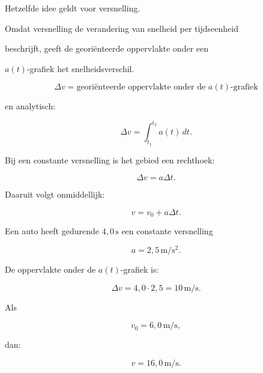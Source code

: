 \documentclass{ximera}
\begin{document}

Hetzelfde idee geldt voor versnelling.

Omdat versnelling de verandering van snelheid per tijdseenheid

beschrijft, geeft de georiënteerde oppervlakte onder een

$a(t)$-grafiek het snelheidsverschil.

\begin{eigenschap}

\[\boxed{ \Delta v = \text{georiënteerde oppervlakte onder de }a(t)\text{-grafiek} }\]

en analytisch:

\[\boxed{ \Delta v = \int_{t_1}^{t_2}a(t)\,dt. }\]

\end{eigenschap}

Bij een constante versnelling is het gebied een rechthoek:

\[\Delta v=a\Delta t.\]

Daaruit volgt onmiddellijk:

\[\boxed{ v=v_0+a\Delta t. }\]

\begin{voorbeeld}

Een auto heeft gedurende $4,0\,\mathrm{s}$ een constante versnelling

\[a=2,5\,\mathrm{m/s^2}.\]

De oppervlakte onder de $a(t)$-grafiek is:

\[\Delta v = 4,0\cdot2,5 = 10\,\mathrm{m/s}.\]

Als

\[v_0=6,0\,\mathrm{m/s},\]

dan:

\[v=16,0\,\mathrm{m/s}.\]

\end{voorbeeld}
\end{document}
